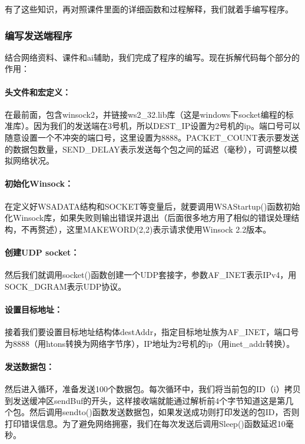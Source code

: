 \documentclass[a4paper]{article}
\begin{document}
有了这些知识，再对照课件里面的详细函数和过程解释，我们就着手编写程序。

\subsubsection{编写发送端程序}

结合网络资料、课件和ai辅助，我们完成了程序的编写。现在拆解代码每个部分的作用：

\paragraph{头文件和宏定义：}在最前面，包含winsock2，并链接ws2\_32.lib库（这是windows下socket编程的标准库）。因为我们的发送端在3号机，所以DEST\_IP设置为2号机的ip。端口号可以随意设置一个不冲突的端口号，这里设置为8888。PACKET\_COUNT表示要发送的数据包数量，SEND\_DELAY表示发送每个包之间的延迟（毫秒），可调整以模拟网络状况。

\paragraph{初始化Winsock：}在定义好WSADATA结构和SOCKET等变量后，就要调用WSAStartup()函数初始化Winsock库，如果失败则输出错误并退出（后面很多地方用了相似的错误处理结构，不再赘述），这里MAKEWORD(2,2)表示请求使用Winsock 2.2版本。

\paragraph{创建UDP socket：}然后我们就调用socket()函数创建一个UDP套接字，参数AF\_INET表示IPv4，用SOCK\_DGRAM表示UDP协议。

\paragraph{设置目标地址：}接着我们要设置目标地址结构体destAddr，指定目标地址族为AF\_INET，端口号为8888（用htons转换为网络字节序），IP地址为2号机的ip（用inet\_addr转换）。

\paragraph{发送数据包：}然后进入循环，准备发送100个数据包。每次循环中，我们将当前包的ID（i）拷贝到发送缓冲区sendBuf的开头，这样接收端就能通过解析前4个字节知道这是第几个包。然后调用sendto()函数发送数据包，如果发送成功则打印发送的包ID，否则打印错误信息。为了避免网络拥塞，我们在每次发送后调用Sleep()函数延迟10毫秒。
\end{document}
